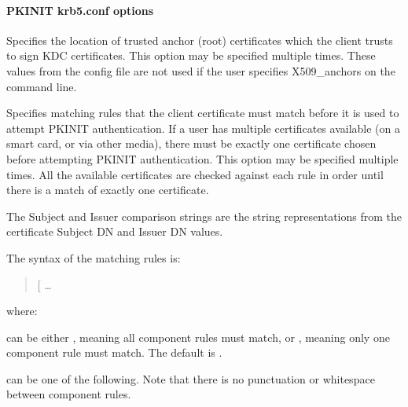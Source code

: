 \documentclass[letterpaper,10pt,english]{sphinxmanual}
\begin{document}
\paragraph{PKINIT krb5.conf options}
\label{\detokenize{admin/conf_files/krb5_conf:pkinit-krb5-conf-options}}\begin{description}
\sphinxAtStartPar
Specifies the location of trusted anchor (root) certificates which
the client trusts to sign KDC certificates.  This option may be
specified multiple times.  These values from the config file are
not used if the user specifies X509\_anchors on the command line.

\sphinxAtStartPar
Specifies matching rules that the client certificate must match
before it is used to attempt PKINIT authentication.  If a user has
multiple certificates available (on a smart card, or via other
media), there must be exactly one certificate chosen before
attempting PKINIT authentication.  This option may be specified
multiple times.  All the available certificates are checked
against each rule in order until there is a match of exactly one
certificate.

\sphinxAtStartPar
The Subject and Issuer comparison strings are the 
string representations from the certificate Subject DN and Issuer
DN values.

\sphinxAtStartPar
The syntax of the matching rules is:
\begin{quote}

\sphinxAtStartPar
{[}\sphinxstyleemphasis{relation\sphinxhyphen{}operator}{]} …
\end{quote}

\sphinxAtStartPar
where:
\begin{description}
\sphinxAtStartPar
can be either \sphinxcode{\sphinxupquote{\&\&}}, meaning all component rules must match,
or \sphinxcode{\sphinxupquote{||}}, meaning only one component rule must match.  The
default is \sphinxcode{\sphinxupquote{\&\&}}.

\sphinxAtStartPar
can be one of the following.  Note that there is no
punctuation or whitespace between component rules.
\begin{quote}


\end{quote}
\end{description}
\end{description}
\end{document}
